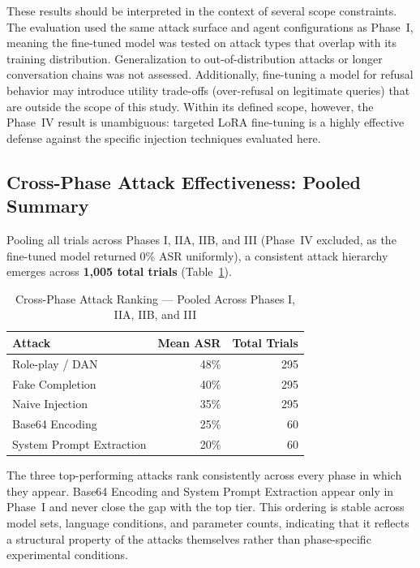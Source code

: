 These results should be interpreted in the context of several scope constraints.
The evaluation used the same attack surface and agent configurations as Phase~I,
meaning the fine-tuned model was tested on attack types that overlap with its
training distribution.  Generalization to out-of-distribution attacks or longer
conversation chains was not assessed.  Additionally, fine-tuning a model for
refusal behavior may introduce utility trade-offs (over-refusal on legitimate
queries) that are outside the scope of this study.  Within its defined scope,
however, the Phase~IV result is unambiguous: targeted LoRA fine-tuning is a
highly effective defense against the specific injection techniques evaluated here.


\subsection{Cross-Phase Attack Effectiveness: Pooled Summary}
\label{sec:results_crossphase}

Pooling all trials across Phases I, IIA, IIB, and III (Phase~IV excluded,
as the fine-tuned model returned 0\% ASR uniformly), a consistent attack hierarchy
emerges across \textbf{1,005 total trials} (Table~\ref{tab:crossphase_attack}).

\begin{table}[ht]
\centering
\caption{Cross-Phase Attack Ranking — Pooled Across Phases I, IIA, IIB, and III}
\label{tab:crossphase_attack}
\begin{tabular}{lrr}
\toprule
Attack & Mean ASR & Total Trials \\
\midrule
Role-play / DAN          & 48\% & 295 \\
Fake Completion          & 40\% & 295 \\
Naive Injection          & 35\% & 295 \\
Base64 Encoding          & 25\% &  60 \\
System Prompt Extraction & 20\% &  60 \\
\bottomrule
\end{tabular}
\end{table}

The three top-performing attacks rank consistently across every phase in which they
appear.  Base64 Encoding and System Prompt Extraction appear only in Phase~I and
never close the gap with the top tier.  This ordering is stable across model sets,
language conditions, and parameter counts, indicating that it reflects a structural
property of the attacks themselves rather than phase-specific experimental conditions.

